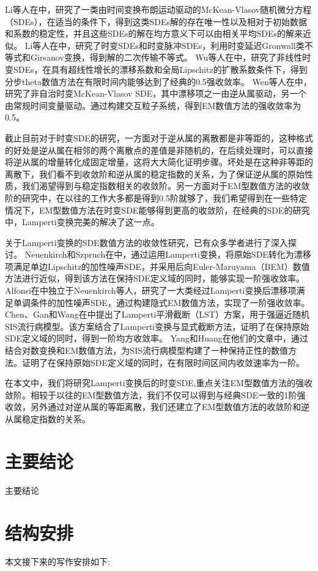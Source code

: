 Li等人在\cite{li2023mckean}中，研究了一类由时间变换布朗运动驱动的McKean-Vlasov随机微分方程（SDEs），在适当的条件下，得到这类SDEs解的存在唯一性以及相对于初始数据和系数的稳定性，并且这些SDEs的解在均方意义下可以由相关平均SDEs的解来近似。
Li等人在\cite{li2023transportation}中，研究了时变SDEs和时变脉冲SDEs，利用时变延迟Gronwall类不等式和Girsanov变换，得到解的二次传输不等式。
Wu等人在\cite{wu2024mean}中，研究了非线性时变SDEs，在具有超线性增长的漂移系数和全局Lipschitz的扩散系数条件下，得到分步theta数值方法在有限时间内能够达到了经典的0.5强收敛率。
Wen等人在\cite{wen2023strong}中，研究了非自治时变McKean-Vlasov SDE，其中漂移项之一由逆从属驱动，另一个由常规时间变量驱动。通过构建交互粒子系统，得到EM数值方法的强收敛率为0.5。

截止目前对于时变SDE的研究，一方面对于逆从属的离散都是非等距的，这种格式的好处是逆从属在相邻的两个离散点的差值是非随机的，在后续处理时，可以直接将逆从属的增量转化成固定增量，这将大大简化证明步骤。坏处是在这种非等距的离散下，我们看不到收敛阶和逆从属的稳定指数的关系，为了保证逆从属的原始性质，我们渴望得到与稳定指数相关的收敛阶。另一方面对于EM型数值方法的收敛阶的研究中，在以往的工作大多都是得到0.5阶就够了，我们希望得到在一些特定情况下，EM型数值方法在时变SDE能够得到更高的收敛阶，在经典的SDE的研究中，Lamperti变换完美的解决了这一点。

关于Lamperti变换的SDE数值方法的收敛性研究，已有众多学者进行了深入探讨。
Neuenkirch和Szpruch在\cite{neuenkirch2014first}中，通过运用Lamperti变换，将原始SDE转化为漂移项满足单边Lipschitz的加性噪声SDE，并采用后向Euler-Maruyama（BEM）数值方法进行近似，得到该方法在保持SDE定义域的同时，能够实现一阶强收敛率。
Alfonsi在\cite{Alfonsi2013602}中独立于Neuenkirch等人，研究了一大类经过Lamperti变换后漂移项满足单调条件的加性噪声SDE，通过构建隐式EM数值方法，实现了一阶强收敛率。
Chen、Gan和Wang在\cite{chen2021first}中提出了Lamperti平滑截断（LST）方案，用于强逼近随机SIS流行病模型。该方案结合了Lamperti变换与显式截断方法，证明了在保持原始SDE定义域的同时，得到一阶均方收敛率。
Yang和Huang在他们的文章\cite{yang2021first}中，通过结合对数变换和EM数值方法，为SIS流行病模型构建了一种保持正性的数值方法。证明了在保持原始SDE定义域的同时，在有限时间区间内收敛速率为一阶。

在本文中，我们将研究Lamperti变换后的时变SDE,重点关注EM型数值方法的强收敛阶。相较于以往的EM型数值方法，我们不仅可以得到与经典SDE一致的1阶强收敛，另外通过对逆从属的等距离散，我们还建立了EM型数值方法的收敛阶和逆从属稳定指数的关系。

\section{主要结论}\label{sec:mainResults}

主要结论


\section{结构安排}

本文接下来的写作安排如下:


